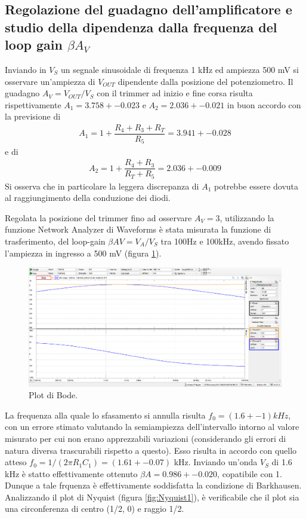 \documentclass[10pt,a4paper]{article}
\begin{document}
\subsection{Regolazione del guadagno dell'amplificatore e studio della
dipendenza dalla frequenza del loop gain $\beta A_V$}

Inviando in $V_S$ un segnale sinusoidale di frequenza 1 kHz ed
ampiezza 500 mV si osservare un'ampiezza di $V_{OUT}$
dipendente dalla posizione del potenziometro. Il
guadagno $A_V = V_{OUT}/V_S$ con il trimmer ad inizio e fine
corsa risulta rispettivamente $A_1 =  3.758+-0.023$ e $A_2 =  2.036+-0.021$ in buon accordo con la previsione di 
\begin{align*}
    A_1 = 1+\dfrac{R_4+R_3+R_T}{R_5}=3.941 +- 0.028
\end{align*}
e di 
\begin{align*}
    A_2 = 1+\dfrac{R_4+R_3}{R_T+R_5} = 2.036+-0.009
\end{align*}
Si osserva che in particolare la leggera discrepanza di $A_1$ potrebbe essere dovuta al raggiungimento della conduzione dei diodi.


Regolata la posizione del trimmer fino ad osservare $A_V = 3$, utilizzando la funzione Network Analyzer di Waveforms
è stata misurata la funzione di trasferimento, del loop-gain $\beta AV = V_A/V_S$ tra 100Hz e 100kHz, avendo fissato l'ampiezza in ingresso a 500
mV (figura \ref{fig:plotbode1}).

\begin{figure}[h]
    \begin{center}
    \includegraphics[width=0.7\linewidth]{plotbode1.png}
    \caption{\small Plot di Bode.}
    \label{fig:plotbode1}
    \end{center}
\end{figure}

La frequenza alla quale lo sfasamento si
annulla risulta  $f_0 = (1.6 +- 1) kHz$, con un errore stimato valutando la semiampiezza dell'intervallo intorno al valore misurato per cui non erano apprezzabili variazioni (considerando gli errori di natura diversa trascurabili rispetto a questo).
Esso risulta in accordo con quello atteso $f_0 = 1/(2\pi R_1 C_1)= (1.61+-0.07)$ kHz. Inviando un'onda $V_S$ di 1.6 kHz è statto effettivamente ottenuto $\beta A = 0.986+-0.020$, copatibile con 1. Dunque a tale frquenza è effettivamente soddisfatta la condizione di Barkhausen.
Analizzando il plot di Nyquist (figura \ref{fig:Nyquist1}), è verificabile che il plot sia una circonferenza di centro (1/2, 0) e raggio
1/2.
\end{document}
